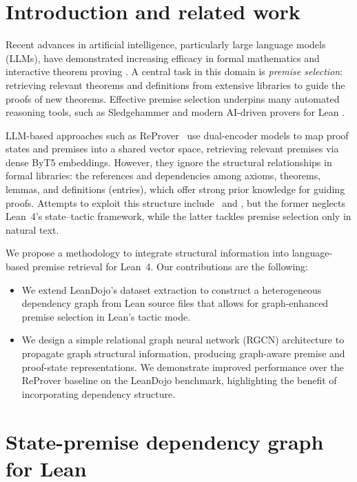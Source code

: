 
\section{Introduction and related work}

Recent advances in artificial intelligence, particularly large language models (LLMs), have demonstrated increasing efficacy in formal mathematics and interactive theorem proving \citep{polu2020generative, jiang2021lisa, xin2024advancing}. A central task in this domain is \emph {premise selection}: retrieving relevant theorems and definitions from extensive libraries to guide the proofs of new theorems. Effective premise selection underpins many automated reasoning tools, such as Sledgehammer \citep{bohme2010sledgehammer} and modern AI-driven provers for Lean \citep{song2023towards}.

LLM-based approaches such as ReProver~\citep{yang2023leandojo} use dual-encoder models to map proof states and premises into a shared vector space, retrieving relevant premises via dense ByT5 embeddings. However, they ignore the structural relationships in formal libraries: the references and dependencies among axioms, theorems, lemmas, and definitions (entries), which offer strong prior knowledge for guiding proofs. Attempts to exploit this structure include~\citep{10.5555/3666122.3668329} and \citep{ferreira-freitas-2020-premise}, but the former neglects Lean~4’s state–tactic framework, while the latter tackles premise selection only in natural text.

We propose a methodology to integrate structural information into language-based premise retrieval for Lean~4. Our contributions are the following:

\begin{itemize}
    \item We extend LeanDojo's dataset extraction to construct a heterogeneous dependency graph from Lean source files that allows for graph-enhanced premise selection in Lean's tactic mode.
    \item We design a simple relational graph neural network (RGCN) architecture to propagate graph structural information, producing graph-aware premise and proof-state representations. We demonstrate improved performance over the ReProver baseline on the LeanDojo benchmark, highlighting the benefit of incorporating dependency structure.
\end{itemize}


\section{State-premise dependency graph for Lean}

